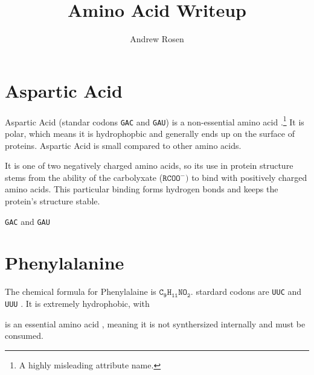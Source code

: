 \documentclass[10pt,letterpaper]{article}
\author{Andrew Rosen}
\title{Amino Acid Writeup}
\begin{document}
\maketitle

\section{Aspartic Acid}
Aspartic Acid (standar codons \texttt{GAC} and \texttt{GAU}) is a non-essential amino acid \cite{young1994adult}.\footnote{A highly misleading attribute name.}
It is polar, which means it is hydrophopbic and generally ends up on the surface of proteins.
Aspartic Acid is small compared to other amino acids.

It is one of two negatively charged amino acids, so its use in protein structure stems from the ability of the carbolyxate ($ \mathtt{RCOO^{-}})$ to bind with positively charged amino acids.
This particular binding forms hydrogen bonds and keeps the protein's structure stable.

\texttt{GAC} and \texttt{GAU}


\section{Phenylalanine}
The chemical formula for Phenylalaine is $ \mathtt{C_9H_{11}NO_2}$.
stardard codons are \texttt{UUC} and \texttt{UUU} \cite{betts2003amino}.
It is extremely hydrophobic, with 


is an essential amino acid \cite{young1994adult}, meaning it is not synthersized internally and must be consumed.



\end{document}
